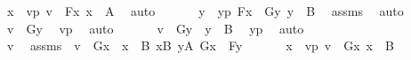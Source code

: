 \begin{isabellebody}
\ x\ \ vp{\isacharcolon}{\kern0pt}\ {\isachardoublequoteopen}v\ {\isacharequal}{\kern0pt}\ F{\isacharparenleft}{\kern0pt}x{\isacharparenright}{\kern0pt}{\isachardoublequoteclose}\ {\isachardoublequoteopen}x\ {\isasymin}\ A{\isachardoublequoteclose}\ \isamarkupfalse%
\ auto\ \isanewline
\ \ \isamarkupfalse%
\ \isamarkupfalse%
\ y\ \ yp{\isacharcolon}{\kern0pt}\ {\isachardoublequoteopen}F{\isacharparenleft}{\kern0pt}x{\isacharparenright}{\kern0pt}\ {\isacharequal}{\kern0pt}\ G{\isacharparenleft}{\kern0pt}y{\isacharparenright}{\kern0pt}{\isachardoublequoteclose}\ {\isachardoublequoteopen}y\ {\isasymin}\ B{\isachardoublequoteclose}\ \isamarkupfalse%
\ assms\ \isamarkupfalse%
\ auto\isanewline
\ \ \isamarkupfalse%
\ \isamarkupfalse%
\ {\isachardoublequoteopen}v\ {\isacharequal}{\kern0pt}\ G{\isacharparenleft}{\kern0pt}y{\isacharparenright}{\kern0pt}{\isachardoublequoteclose}\ \isamarkupfalse%
\ vp\ \isamarkupfalse%
\ auto\ \isanewline
\ \ \isamarkupfalse%
\ \isamarkupfalse%
\ {\isachardoublequoteopen}v\ {\isasymin}\ {\isacharbraceleft}{\kern0pt}G{\isacharparenleft}{\kern0pt}y{\isacharparenright}{\kern0pt}\ {\isachardot}{\kern0pt}\ y\ {\isasymin}\ B{\isacharbraceright}{\kern0pt}{\isachardoublequoteclose}\ \isamarkupfalse%
\ yp\ \isamarkupfalse%
\ auto\ \isanewline
{}\isamarkupfalse%
\ \ \ \ \ \ \ \ \ \ \ \ \ \ \ \ \ \ \isanewline
\ \ \isamarkupfalse%
\ v\ \isamarkupfalse%
\ assms\ {\isacharcolon}{\kern0pt}\ {\isachardoublequoteopen}v\ {\isasymin}\ {\isacharbraceleft}{\kern0pt}G{\isacharparenleft}{\kern0pt}x{\isacharparenright}{\kern0pt}\ {\isachardot}{\kern0pt}\ x\ {\isasymin}\ B{\isacharbraceright}{\kern0pt}{\isachardoublequoteclose}\ {\isachardoublequoteopen}{\isasymforall}x{\isasymin}B{\isachardot}{\kern0pt}\ {\isasymexists}y{\isasymin}A{\isachardot}{\kern0pt}\ G{\isacharparenleft}{\kern0pt}x{\isacharparenright}{\kern0pt}\ {\isacharequal}{\kern0pt}\ F{\isacharparenleft}{\kern0pt}y{\isacharparenright}{\kern0pt}{\isachardoublequoteclose}\ \isanewline
\ \ \isamarkupfalse%
\ \isamarkupfalse%
\ x\ \ vp{\isacharcolon}{\kern0pt}\ {\isachardoublequoteopen}v\ {\isacharequal}{\kern0pt}\ G{\isacharparenleft}{\kern0pt}x{\isacharparenright}{\kern0pt}{\isachardoublequoteclose}\ {\isachardoublequoteopen}x\ {\isasymin}\ B{\isachardoublequoteclose}\ \isamarkupfalse%

\end{isabellebody}
